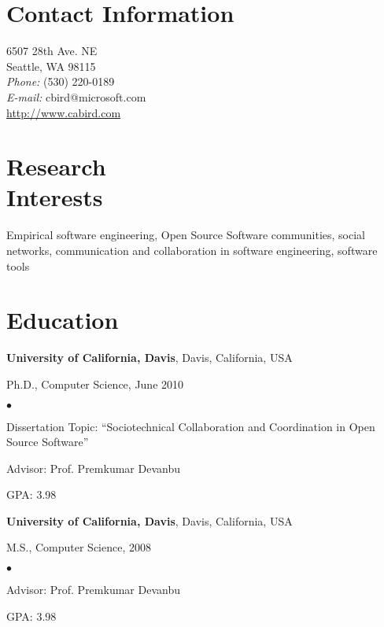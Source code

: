 \documentclass[margin,line,article,letterpaper]{res}
\newenvironment{list1}{
  \begin{list}{}{%
      \setlength{\itemsep}{0in}
      \setlength{\parsep}{0in} \setlength{\parskip}{0in}
      \setlength{\topsep}{0in} \setlength{\partopsep}{0in} 
      \setlength{\leftmargin}{0.17in}}}{\end{list}}
\newenvironment{list2}{
  \begin{list}{$\bullet$}{%
      \setlength{\itemsep}{0in}
      \setlength{\parsep}{0in} \setlength{\parskip}{0in}
      \setlength{\topsep}{0in} \setlength{\partopsep}{0in} 
      \setlength{\leftmargin}{0.2in}}}{\end{list}}
\begin{document}



\begin{resume}
\section{Contact Information}
\vspace{.05in}
6507 28th Ave. NE\\
Seattle, WA 98115\\
{\it Phone:}  (530) 220-0189 \\
{\it E-mail:}  cbird@microsoft.com\\
\url{http://www.cabird.com}
 
\section{Research \\
Interests}
Empirical software engineering, Open Source Software communities, social networks, 
communication and collaboration in software engineering, 
software tools

\section{Education}
\textbf{University of California, Davis}, Davis, California, USA
\begin{list1}
\item Ph.D., Computer Science, June 2010
\begin{list2}
\vspace*{.05in}
\item Dissertation Topic:  ``Sociotechnical Collaboration and Coordination in Open Source Software'' 
\item Advisor:  Prof. Premkumar Devanbu
\item GPA: 3.98
\end{list2}
\end{list1}

\textbf{University of California, Davis}, Davis, California, USA
\begin{list1}
\item M.S., Computer Science, 2008
\begin{list2}
\vspace*{.05in}
\item Advisor:  Prof. Premkumar Devanbu
\item GPA: 3.98
\end{list2}
\end{list1}


\end{resume}
\end{document}
